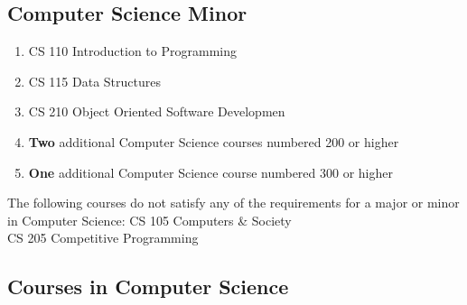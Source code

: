 \documentclass[
  letterpaper,
]{scrbook}
\providecommand{\tightlist}{%
  \setlength{\itemsep}{0pt}\setlength{\parskip}{0pt}}
\begin{document}
\subsection{Computer Science Minor}\label{computer-science-minor}

\begin{enumerate}
\def\labelenumi{\arabic{enumi}.}
\tightlist
\item
  CS 110 Introduction to Programming\\
\item
  CS 115 Data Structures\\
\item
  CS 210 Object Oriented Software Developmen\\
\item
  \textbf{Two} additional Computer Science courses numbered 200 or
  higher
\item
  \textbf{One} additional Computer Science course numbered 300 or higher
\end{enumerate}

The following courses do not satisfy any of the requirements for a major
or minor in Computer Science: CS 105 Computers \& Society\\
CS 205 Competitive Programming

\subsection{Courses in Computer
Science}\label{courses-in-computer-science}
\end{document}
